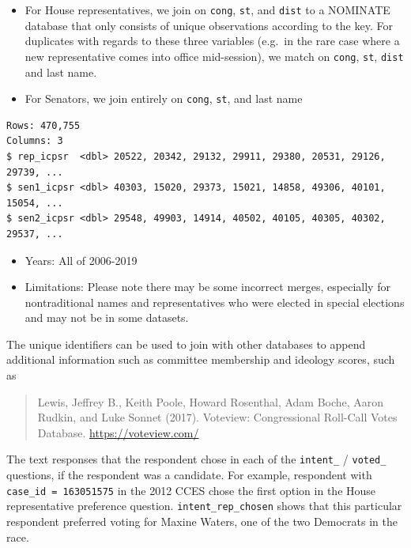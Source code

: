 \documentclass[10pt,article,oneside]{memoir}
\theoremstyle{definition}
\begin{document}
\begin{itemize}
\tightlist
\item
  For House representatives, we join on \texttt{cong}, \texttt{st}, and
  \texttt{dist} to a NOMINATE database that only consists of unique
  observations according to the key. For duplicates with regards to
  these three variables (e.g.~in the rare case where a new
  representative comes into office mid-session), we match on
  \texttt{cong}, \texttt{st}, \texttt{dist} and last name.
\item
  For Senators, we join entirely on \texttt{cong}, \texttt{st}, and last
  name
\end{itemize}

\begin{verbatim}
Rows: 470,755
Columns: 3
$ rep_icpsr  <dbl> 20522, 20342, 29132, 29911, 29380, 20531, 29126, 29739, ...
$ sen1_icpsr <dbl> 40303, 15020, 29373, 15021, 14858, 49306, 40101, 15054, ...
$ sen2_icpsr <dbl> 29548, 49903, 14914, 40502, 40105, 40305, 40302, 29537, ...
\end{verbatim}

\begin{itemize}
\tightlist
\item
  Years: All of 2006-2019
\item
  Limitations: Please note there may be some incorrect merges,
  especially for nontraditional names and representatives who were
  elected in special elections and may not be in some datasets.
\end{itemize}

The unique identifiers can be used to join with other databases to
append additional information such as committee membership and ideology
scores, such as

\begin{quote}
Lewis, Jeffrey B., Keith Poole, Howard Rosenthal, Adam Boche, Aaron
Rudkin, and Luke Sonnet (2017). Voteview: Congressional Roll-Call Votes
Database. \url{https://voteview.com/}
\end{quote}

The text responses that the respondent chose in each of the
\texttt{intent\_} / \texttt{voted\_} questions, if the respondent was a
candidate. For example, respondent with \texttt{case\_id\ =\ 163051575}
in the 2012 CCES chose the first option in the House representative
preference question. \texttt{intent\_rep\_chosen} shows that this
particular respondent preferred voting for Maxine Waters, one of the two
Democrats in the race.
\end{document}
